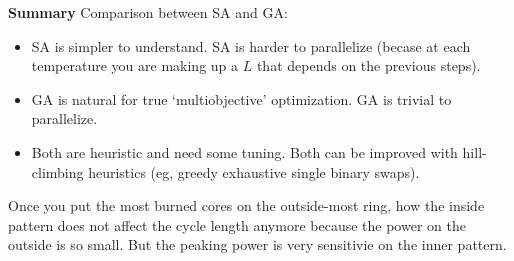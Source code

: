 \documentclass{school-22.211-notes}
\begin{document}
\textbf{Summary}
Comparison between SA and GA:
\begin{itemize}
\item SA is simpler to understand. SA is harder to parallelize (becase at each temperature you are making up a $L$ that depends on the previous steps). 
\item GA is natural for true `multiobjective' optimization. GA is trivial to parallelize. 
\item Both are heuristic and need some tuning. Both can be improved with hill-climbing heuristics (eg, greedy exhaustive single binary swaps). 
\end{itemize}
Once you put the most burned cores on the outside-most ring, how the inside pattern does not affect the cycle length anymore because the power on the outside is so small. But the peaking power is very sensitivie on the inner pattern. 
\end{document}
